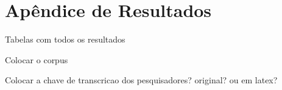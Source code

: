 \chapter{Apêndice de Resultados}
\label{ch09-appendice}

Tabelas com todos os resultados


Colocar o corpus

Colocar a chave de transcricao dos pesquisadores? original? ou em latex?
